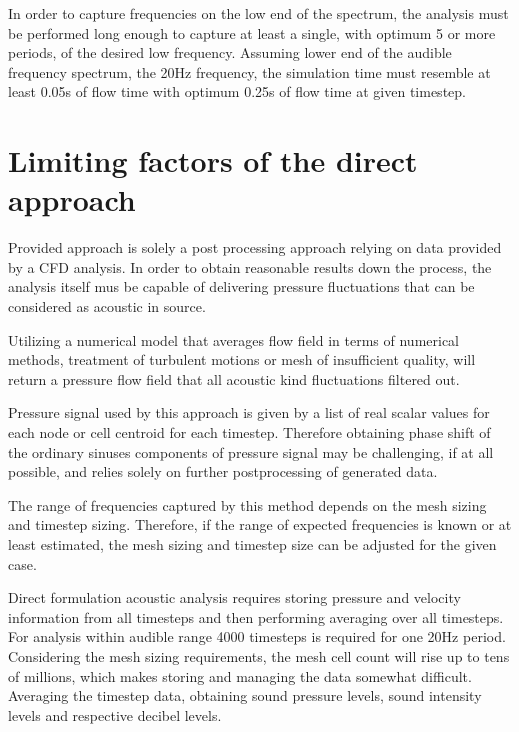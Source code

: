 In order to capture frequencies on the low end of the spectrum, the analysis must be performed long enough to capture at least a single, with optimum 5 or more periods, of the desired low frequency. Assuming lower end of the audible frequency spectrum, the 20Hz frequency, the simulation time must resemble at least 0.05s of flow time with optimum 0.25s of flow time at given timestep.


\section{Limiting factors of the direct approach} \label{limits}
Provided approach is solely a post processing approach relying on data provided by a CFD analysis. In order to obtain reasonable results down the process, the analysis itself mus be capable of delivering pressure fluctuations that can be considered as acoustic in source. 

Utilizing a numerical model that averages flow field in terms of numerical methods, treatment of turbulent motions or mesh of insufficient quality, will return a pressure flow field that all acoustic kind fluctuations filtered out. 

Pressure signal used by this approach is given by a list of real scalar values for each node or cell centroid for each timestep. Therefore obtaining phase shift of the ordinary sinuses components of pressure signal may be challenging, if at all possible, and relies solely on further postprocessing of generated data. 

The range of frequencies captured by this method depends on the mesh sizing and timestep sizing. Therefore, if the range of expected frequencies is known or at least estimated, the mesh sizing and timestep size can be adjusted for the given case.
 
Direct formulation acoustic analysis requires storing pressure and velocity information from all timesteps and then performing averaging over all timesteps. For analysis within audible range 4000 timesteps is required for one 20Hz period. Considering the mesh sizing requirements, the mesh cell count will rise up to tens of millions, which makes storing and managing the data somewhat difficult. Averaging the timestep data, obtaining sound pressure levels, sound intensity levels and respective decibel levels. 

